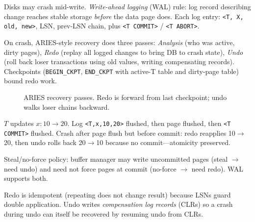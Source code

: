 Disks may crash mid-write. \emph{Write-ahead logging} (WAL) rule: log record describing change reaches stable storage \emph{before} the data page does. Each log entry: \texttt{<T, X, old, new>}, LSN, prev-LSN chain, plus \texttt{<T COMMIT>} / \texttt{<T ABORT>}.

On crash, ARIES-style recovery does three passes: \emph{Analysis} (who was active, dirty pages), \emph{Redo} (replay all logged changes to bring DB to crash state), \emph{Undo} (roll back loser transactions using old values, writing compensating records). Checkpoints (\texttt{BEGIN\_CKPT}, \texttt{END\_CKPT} with active-T table and dirty-page table) bound redo work.

\begin{figure}[h]
\centering
{}
\caption{ARIES recovery passes. Redo is forward from last checkpoint; undo walks loser chains backward.}
\label{fig:aries}
\end{figure}

\begin{example}
$T$ updates $x:10\to20$. Log \texttt{<T,x,10,20>} flushed, then page flushed, then \texttt{<T COMMIT>} flushed. Crash after page flush but before commit: redo reapplies 10$\to$20, then undo rolls back 20$\to$10 because no commit---atomicity preserved.
\end{example}

Steal/no-force policy: buffer manager may write uncommitted pages (steal $\to$ need undo) and need not force pages at commit (no-force $\to$ need redo). WAL supports both.

\begin{remark}
Redo is idempotent (repeating does not change result) because LSNs guard double application. Undo writes \emph{compensation log records} (CLRs) so a crash during undo can itself be recovered by resuming undo from CLRs.
\end{remark}

